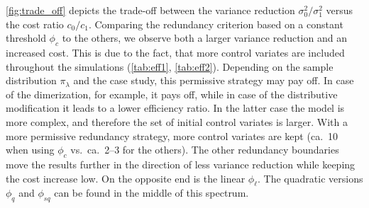 \autoref{fig:trade_off} depicts the trade-off between the variance reduction $\sigma_0^2/\sigma_1^2$
versus the cost ratio $c_0/c_1$. Comparing the redundancy criterion based on a constant threshold
$\phi_c$ to the others,
we observe both a larger variance reduction and an increased cost. This is due to the fact, that
more control  variates are included throughout the simulations (\autoref{tab:eff1}, \autoref{tab:eff2}). Depending on the sample distribution $\pi_{\lambda}$
and the case study, this permissive strategy may pay off. In case of the dimerization, for example,
it pays off, while in case of the distributive modification it leads to a lower efficiency ratio.
In the latter case the model is more complex, and therefore the set of initial
control  variates is larger. With a more permissive redundancy strategy, more control  variates are kept
(ca.\ 10 when using $\phi_c$ vs.\ ca.\ 2--3 for the others).
The other redundancy boundaries move the results further in the direction of less variance reduction
while keeping the cost increase low.
On the opposite end is the linear $\phi_{\ell}$.
The quadratic versions $\phi_{q}$ and $\phi_{\mathit{sq}}$ can be found in the middle of this spectrum.
